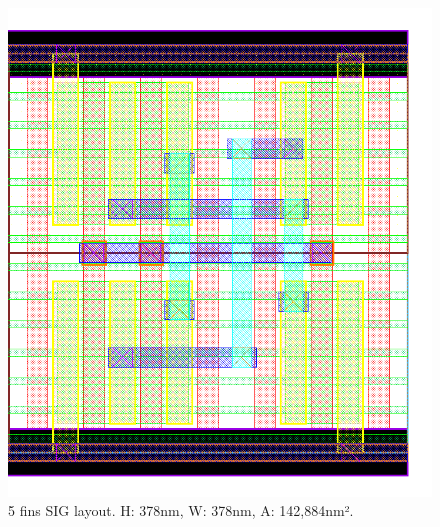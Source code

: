 \documentclass[diss,pgmicro,english]{iiufrgs}
\begin{document}
\begin{figure}[]
\centering
\includegraphics[width=\textwidth,height=\textheight,keepaspectratio]{SIG5F.png}
\caption{5 fins SIG layout. H: 378nm, W: 378nm, A: 142,884nm².}
\label{fig:SIG5F}
\end{figure}
\end{document}

